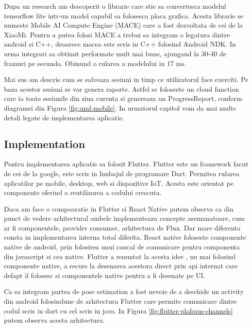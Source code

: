 Dupa un research am descoperit o librarie care stie sa convertesca modelul tensorflow lite intr-un model capabil sa 
folosesca placa grafica. Acesta librarie se numeste Mobile AI Compute Engine (MACE)  care a fost dezvoltata de cei de la XiaoMi. Pentru a putea folosi MACE a trebui sa integram o legatura dintre android si C++, deoarece macea este scris in C++ folosind Android NDK.
In urma integrari sa obtinut performate mult mai bune, ajungand la 30-40 de framuri pe secunda.
Obinund o rularea a modelului in 17 ms.

Mai sus am descris cum se salveaza sesiuni in timp ce utilizatorul face exerciti.
Pe baza acestor sesiuni se vor genera raporte. Astfel se foloseste un cloud function care ia toate sesiunile din ziua curenta si genereaza un ProgressReport, conform diagramei din Figura \ref{fig:uml-mobile}.
In urmatorul capitol vom da mai multe detali legate de implementarea aplicatie.

\subsection{Implementation}
Pentru implementarea aplicatie sa folosit Flutter.
Flutter este un framework facut de cei de la google, este scris in limbajul de programare Dart. Permitea rularea aplicatilor pe mobile, desktop, web si dispozitive IoT. Acesta este orientat pe componente oferind o reutilizarea a codului crescuta.

Daca am face o compoaratie in Flutter si React Native putem observa ca din punct de vedere arhitectural ambele implementeaza concepte asemanatoare, cum ar fi componentele, provider consumer, arhitectura de Flux.
Dar mare diferenta consta in implementarea interna total diferita.
React native foloseste componente native de android, prin folosirea unui cancal de comunicare pentru componenta din javascript si cea native.
Flutter a renuntat la acesta idee , nu mai folosind componente native, a recurs la desenarea acestora direct prin
api internat care defapt il folosesc si componentele native pentru a fi desenate pe UI.


Ca sa integram partea de pose estimation a fost nevoie de a deschide un activity din android folosindune de arhitectura Flutter care permite comunicare dintre codul scris in dart cu cel scris in java. In Figura  \ref{fig:flutter-plaform-channels} putem observa acesta arhitectura.

